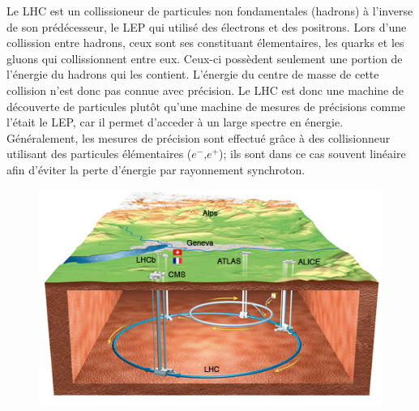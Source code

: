 Le LHC est un collissioneur de particules non fondamentales (hadrons) à l'inverse de son prédécesseur, le LEP qui utilisé des électrons et des positrons. Lors d'une collission entre hadrons, ceux sont ses constituant élementaires, les quarks et les gluons qui collissionnent entre eux. Ceux-ci possèdent seulement une portion de l'énergie du hadrons qui les contient. L'énergie du centre de masse de cette collision n'est donc pas connue avec précision. Le LHC est donc une machine de découverte de particules plutôt qu'une machine de mesures de précisions comme l'était le LEP, car il permet d'acceder à un large spectre en énergie. Généralement, les mesures de précision sont effectué grâce à des collisionneur utilisant des particules élémentaires ($e^{-}$,$e^{+}$); ils sont dans ce cas souvent linéaire afin d'éviter la perte d'énergie par rayonnement synchroton.

\begin{figure}
  	\centering
	\includegraphics[scale=0.8]{LHC/CERNMap.jpg}
  	\label{lhcschema}
\end{figure}


